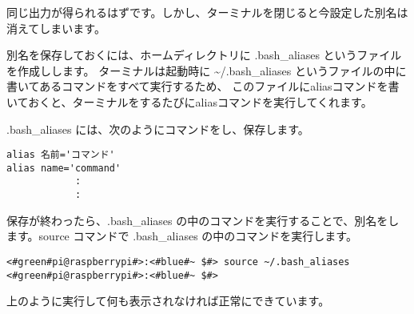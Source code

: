 同じ出力が得られるはずです。しかし、ターミナルを閉じると今設定した別名は消えてしまいます。

別名を保存しておくには、ホームディレクトリに .bash{\_}aliases というファイルを作成しします。
ターミナルは起動時に \textasciitilde/.bash{\_}aliases というファイルの中に書いてあるコマンドをすべて実行するため、
このファイルにaliasコマンドを書いておくと、ターミナルをするたびにaliasコマンドを実行してくれます。

.bash{\_}aliases には、次のようにコマンドをし、保存します。
\begin{lstlisting}[caption=\textasciitilde/.bash\_aliasesの書き方1, label=bashAliasesGrammar1]
alias 名前='コマンド'
alias name='command'
            :
            :
\end{lstlisting}

保存が終わったら、.bash{\_}aliases の中のコマンドを実行することで、別名をします。source コマンドで .bash{\_}aliases の中のコマンドを実行します。
\begin{lstlisting}[caption=\textasciitilde/.bash\_aliasesの読込, label=sourceBashAliases]
<#green#pi@raspberrypi#>:<#blue#~ $#> source ~/.bash_aliases
<#green#pi@raspberrypi#>:<#blue#~ $#>
\end{lstlisting}

上のように実行して何も表示されなければ正常にできています。


